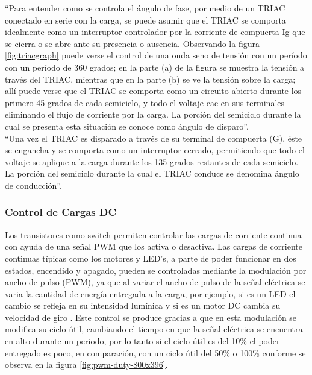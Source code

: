 ``Para entender como se controla el ángulo de fase, por medio de un TRIAC conectado en serie con la carga, se puede asumir que el TRIAC se comporta idealmente como un interruptor controlador por la corriente de compuerta Ig que se cierra o se abre ante su presencia o ausencia. Observando la figura \ref{fig:triacgraph} puede verse el control de una onda seno de tensión con un período con un período de 360 grados; en la parte (a) de la figura se muestra la tensión a través del TRIAC, mientras que en la parte (b) se ve la tensión sobre la carga; allí puede verse que el TRIAC se comporta como un circuito abierto durante los primero 45 grados de cada semiciclo, y todo el voltaje cae en sus terminales eliminando el flujo de corriente por la carga. La porción del semiciclo durante la cual se presenta esta situación se conoce como ángulo de disparo''\cite{CEKIT}.\\

``Una vez el TRIAC es disparado a través de su terminal de compuerta (G), éste se engancha y se comporta como un interruptor cerrado, permitiendo que todo el voltaje se aplique a la carga durante los 135 grados restantes de cada semiciclo. La porción del semiciclo durante la cual el TRIAC conduce se denomina ángulo de conducción''\cite{CEKIT}.


\subsubsection{Control de Cargas DC}

Los transistores como switch permiten controlar las cargas de corriente continua con ayuda de una señal PWM que los activa o desactiva. Las cargas de corriente continuas típicas como los motores y LED's, a parte de poder funcionar en dos estados, encendido y apagado, pueden se controladas mediante la modulación por ancho de pulso (PWM), ya que al variar el ancho de pulso de la señal eléctrica se varia la cantidad de energía entregada a la carga, por ejemplo, si es un LED el cambio se refleja en su intensidad lumínica y si es un motor DC cambia su velocidad de giro \cite{PWM}. Este control se produce gracias a que en esta modulación se modifica su ciclo útil, cambiando el tiempo en que la señal eléctrica se encuentra en alto durante un periodo, por lo tanto si el ciclo útil es del 10\% el poder entregado es poco, en comparación, con un ciclo útil del 50\% o 100\% conforme se observa en la figura \ref{fig:pwm-duty-800x396}.

